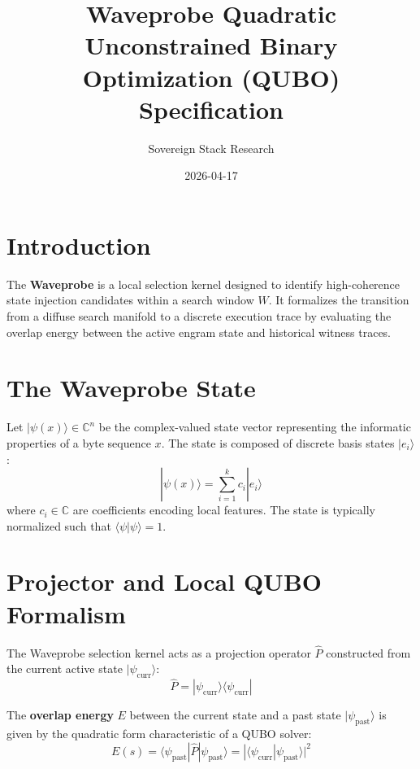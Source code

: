 \documentclass[11pt,a4paper]{article}
\title{Waveprobe Quadratic Unconstrained Binary Optimization (QUBO) Specification}
\author{Sovereign Stack Research}
\date{2026-04-17}
\begin{document}
\maketitle

\section{Introduction}

The \textbf{Waveprobe} is a local selection kernel designed to identify high-coherence state injection candidates within a search window $W$. It formalizes the transition from a diffuse search manifold to a discrete execution trace by evaluating the overlap energy between the active engram state and historical witness traces.

\section{The Waveprobe State}

Let $|\psi(x)\rangle \in \mathbb{C}^n$ be the complex-valued state vector representing the informatic properties of a byte sequence $x$. The state is composed of discrete basis states $|e_i\rangle$:
\begin{equation}
|\psi(x)\rangle = \sum_{i=1}^{k} c_i |e_i\rangle
\end{equation}
where $c_i \in \mathbb{C}$ are coefficients encoding local features. The state is typically normalized such that $\langle \psi | \psi \rangle = 1$.

\section{Projector and Local QUBO Formalism}

The Waveprobe selection kernel acts as a projection operator $\hat{P}$ constructed from the current active state $|\psi_{\text{curr}}\rangle$:
\begin{equation}
\hat{P} = |\psi_{\text{curr}}\rangle \langle \psi_{\text{curr}}|
\end{equation}

The \textbf{overlap energy} $E$ between the current state and a past state $|\psi_{\text{past}}\rangle$ is given by the quadratic form characteristic of a QUBO solver:
\begin{equation}
E(s) = \langle \psi_{\text{past}} | \hat{P} | \psi_{\text{past}} \rangle = |\langle \psi_{\text{curr}} | \psi_{\text{past}} \rangle|^2
\end{equation}
\end{document}
